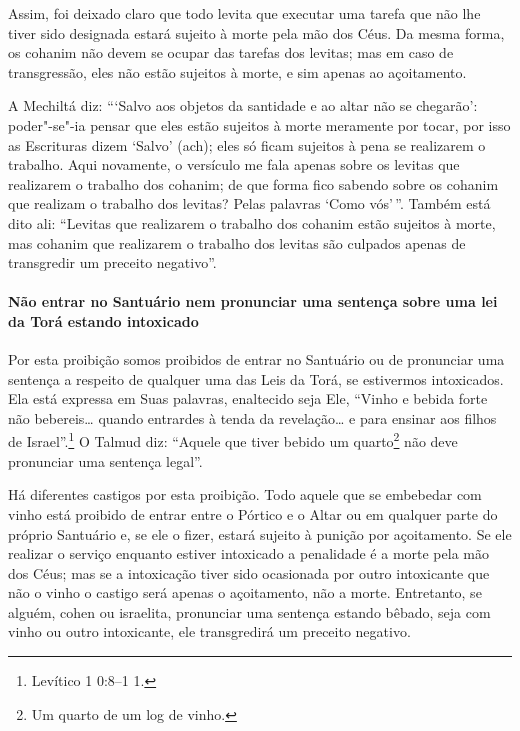\begin{multicols}{2}
Assim, foi deixado claro que todo levita\starr{} que executar uma tarefa que não
lhe tiver sido designada estará sujeito à morte pela mão dos Céus. Da
mesma forma, os cohanim\starr{} não devem se ocupar das tarefas dos levitas\starr;
mas em caso de transgressão, eles não estão sujeitos à morte, e sim
apenas ao açoitamento.

A Mechiltá\starr{} diz: ```Salvo aos objetos da santidade e ao altar não se
chegarão': poder"-se"-ia pensar que eles estão sujeitos à morte meramente
por tocar, por isso as Escrituras dizem `Salvo' (ach); eles só ficam
sujeitos à pena se realizarem o trabalho. Aqui novamente, o versículo me
fala apenas sobre os levitas\starr{} que realizarem o trabalho dos cohanim\starr; de
que forma fico sabendo sobre os cohanim\starr{} que realizam o trabalho dos levitas\starr? Pelas palavras `Como
vós'\,''. Também está dito ali: ``Levitas\starr{} que realizarem o trabalho dos
cohanim\starr{} estão sujeitos à morte, mas cohanim\starr{} que realizarem o
trabalho dos levitas\starr{} são culpados apenas de transgredir um preceito
negativo''.

\paragraph{Não entrar no Santuário nem pronunciar uma
sentença sobre uma lei da Torá\starr{} estando intoxicado}

Por esta proibição somos proibidos de entrar no Santuário ou de
pronunciar uma sentença a respeito de qualquer uma das Leis da Torá\starr, se
estivermos intoxicados. Ela está expressa em Suas palavras, enaltecido
seja Ele, ``Vinho e bebida forte não bebereis\ldots{} quando entrardes à
tenda da revelação\ldots{} e para ensinar aos filhos de Israel''.\footnote{Levítico 1
0:8--1 1.} O Talmud\starr{} diz: ``Aquele que tiver bebido um
quarto\footnote{Um quarto de um log\starr{} de vinho.} não deve pronunciar uma sentença legal''.

Há diferentes castigos por esta proibição. Todo aquele que se embebedar
com vinho está proibido de entrar entre o Pórtico e o Altar ou em
qualquer parte do próprio Santuário e, se ele o fizer, estará sujeito à
punição por açoitamento. Se ele realizar o serviço enquanto estiver
intoxicado a penalidade é a morte pela mão dos Céus; mas se a
intoxicação tiver sido ocasionada por outro intoxicante que não o vinho
o castigo será apenas o açoitamento, não a morte. Entretanto, se alguém,
cohen\starr{} ou israelita, pronunciar uma sentença estando bêbado, seja
com vinho ou outro intoxicante, ele transgredirá um preceito negativo.


\end{multicols}
